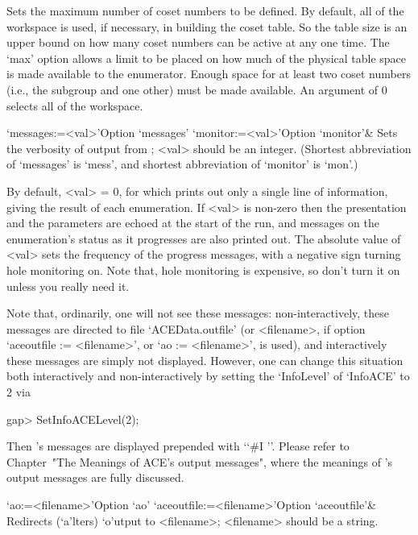 Sets the maximum  number of coset numbers to  be defined.  By default,
all  of the workspace  is used,  if necessary,  in building  the coset
table.  So the table size is  an upper bound on how many coset numbers
can be active at any one time.   The `max' option allows a limit to be
placed on  how much of the  physical table space is  made available to
the enumerator.   Enough space for  at least two coset  numbers (i.e.,
the subgroup and one other) must  be made available.  An argument of 0
selects all of the workspace.

\enditems



\beginitems

\>`messages:=<val>'{Option `messages'}
\>`monitor:=<val>'{Option `monitor'}&
Sets the verbosity of output from {\ACE}; <val> should be an integer.
(Shortest  abbreviation  of  `messages'  is   `mess',   and   shortest
abbreviation of `monitor' is `mon'.)

By default, <val> = 0, for which {\ACE} prints out only a single  line
of information, giving the result of each  enumeration.  If  <val>  is
non-zero then the presentation and the parameters are  echoed  at  the
start of the run, and messages  on  the  enumeration's  status  as  it
progresses are also printed out. The absolute value of <val> sets  the
frequency of the progress messages, with a negative sign turning  hole
monitoring on. Note that, hole monitoring is expensive, so don't  turn
it on unless you really need it.

Note   that,  ordinarily,  one   will   not   see   these    messages:
non-interactively,   these   messages    are    directed    to    file
`ACEData.outfile'   (or   <filename>,   if   option   `aceoutfile   :=
<filename>', or `ao := <filename>', is used), and interactively  these
messages are simply  not  displayed.  However,  one  can  change  this
situation both interactively and   non-interactively  by  setting  the
`InfoLevel' of `InfoACE' to 2 via

\begintt
gap> SetInfoACELevel(2);
\endtt

Then {\ACE}'s messages are  displayed  prepended  with  \lq{}`\#I  ''.
Please refer to Chapter~"The Meanings of ACE's output messages", where
the meanings of {\ACE}'s output messages are fully discussed.

\>`ao:=<filename>'{Option `ao'}
\>`aceoutfile:=<filename>'{Option `aceoutfile'}&
Redirects (`a'lters) `o'utput to <filename>; <filename>  should  be  a
string.

